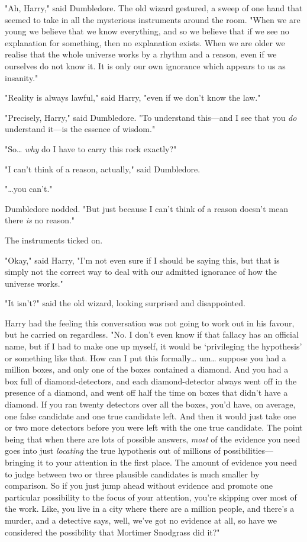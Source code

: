 "Ah, Harry," said Dumbledore. The old wizard gestured, a sweep of one hand that
seemed to take in all the mysterious instruments around the room. "When we are
young we believe that we know everything, and so we believe that if we see no
explanation for something, then no explanation exists. When we are older we
realise that the whole universe works by a rhythm and a reason, even if we
ourselves do not know it. It is only our own ignorance which appears to us as
insanity."

"Reality is always lawful," said Harry, "even if we don't know the law."

"Precisely, Harry," said Dumbledore. "To understand this---and I see that you
\emph{do} understand it---is the essence of wisdom."

"So{\ldots} \emph{why} do I have to carry this rock exactly?"

"I can't think of a reason, actually," said Dumbledore.

"{\ldots}you can't."

Dumbledore nodded. "But just because I can't think of a reason doesn't mean
there \emph{is} no reason."

The instruments ticked on.

"Okay," said Harry, "I'm not even sure if I should be saying this, but that is
simply not the correct way to deal with our admitted ignorance of how the
universe works."

"It isn't?" said the old wizard, looking surprised and disappointed.

Harry had the feeling this conversation was not going to work out in his
favour, but he carried on regardless. "No. I don't even know if that fallacy
has an official name, but if I had to make one up myself, it would be
`privileging the hypothesis' or something like that. How can I put this
formally{\ldots} um{\ldots} suppose you had a million boxes, and only one of
the boxes contained a diamond. And you had a box full of diamond-detectors, and
each diamond-detector always went off in the presence of a diamond, and went
off half the time on boxes that didn't have a diamond. If you ran twenty
detectors over all the boxes, you'd have, on average, one false candidate and
one true candidate left. And then it would just take one or two more detectors
before you were left with the one true candidate. The point being that when
there are lots of possible answers, \emph{most} of the evidence you need goes
into just \emph{locating} the true hypothesis out of millions of
possibilities---bringing it to your attention in the first place. The amount of
evidence you need to judge between two or three plausible candidates is much
smaller by comparison. So if you just jump ahead without evidence and promote
one particular possibility to the focus of your attention, you're skipping over
most of the work. Like, you live in a city where there are a million people,
and there's a murder, and a detective says, well, we've got no evidence at all,
so have we considered the possibility that Mortimer Snodgrass did it?"

